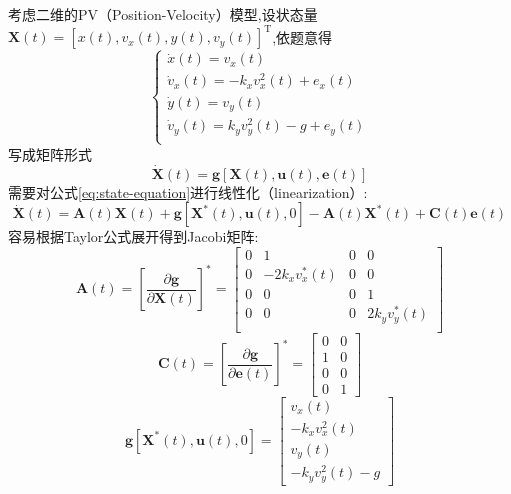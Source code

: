 \documentclass[cn,10pt,citestyle=gb7714-2015,bibstyle=gb7714-2015]{elegantbook}
\newcommand{\mT}{\mathrm{T}}
\begin{document}
\begin{solution}
  考虑二维的PV（Position-Velocity）模型,设状态量$\bm{X}(t)=[x(t),v_x(t),y(t),v_y(t)]^\mT$,依题意得
    \begin{equation}
        \left\{ \begin{array}{l}
            \dot{x}\left( t \right) =v_x\left( t \right)\\
            \dot{v}_x\left( t \right) =-k_xv_{x}^{2}\left( t \right) +e_x\left( t \right)\\
            \dot{y}\left( t \right) =v_y\left( t \right)\\
            \dot{v}_y\left( t \right) =k_yv_{y}^{2}\left( t \right) -g+e_y\left( t \right)\\
        \end{array} \right. 
    \end{equation}
    写成矩阵形式
    \begin{equation}\label{eq:state-equation}
        \dot{\bm{X}}(t)=\bm{g}\left[\bm{X}(t),\bm{u}(t),\bm{e}(t)\right]
    \end{equation}
    需要对公式\eqref{eq:state-equation}进行线性化（linearization）:
    \begin{equation}\label{eq:state-line-equation}
        \dot{\bm{X}}(t)=\bm{A}(t)\bm{X}(t)+\bm{g}\left[\bm{X}^*(t),\bm{u}(t),0\right]-\bm{A}(t)\bm{X}^*(t)+\bm{C}(t)\bm{e}(t)
    \end{equation}
    容易根据Taylor公式展开得到Jacobi矩阵:
    \begin{equation}
        \bm{A}\left( t \right) =\left[ \frac{\partial \bm{g}}{\partial \bm{X}(t)} \right] ^*=\left[ \begin{matrix}
            0&		1&		0&		0\\
            0&		-2k_xv_{x}^{*}\left( t \right)&		0&		0\\
            0&		0&		0&		1\\
            0&		0&		0&		2k_yv_{y}^{*}\left( t \right)\\
        \end{matrix} \right] 
    \end{equation}
    \begin{equation}
        \bm{C}\left( t \right) =\left[\frac{\partial\bm{g}}{\partial\bm{e}(t)}\right]^*=\begin{bmatrix}
            0&0\\
            1&0\\
            0&0\\
            0&1
        \end{bmatrix}
    \end{equation}
    \begin{equation}
        \bm{g}\left[\bm{X}^*(t),\bm{u}(t),0\right]=\begin{bmatrix}
            v_x(t)\\
            -k_xv_x^2(t)\\
            v_y(t)\\
            -k_yv_y^2(t)-g
        \end{bmatrix}
    \end{equation}


\end{solution}
\end{document}
